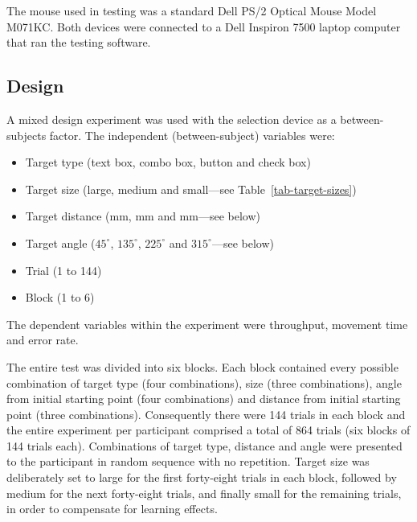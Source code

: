 \documentclass{elsart}
\begin{document}
The mouse used in testing was a standard Dell PS/2 Optical Mouse Model
M071KC. Both devices were connected to a Dell Inspiron 7500 laptop
computer that ran the testing software.


\subsection{Design}
\label{sec-method-design}

A mixed design experiment was used with the selection device as a
between-subjects factor. The independent (between-subject) variables
were:
\begin{itemize}

	\item Target type (text box, combo box, button and check box)

	\item Target size (large, medium and small---see
	Table~\ref{tab-target-sizes})

	\item Target distance (\unit[40]{mm}, \unit[80]{mm} and
	\unit[160]{mm}---see below)

	\item Target angle (\(45^{\circ}\), \(135^{\circ}\), \(225^{\circ}\)
	and \(315^{\circ}\)---see below)

	\item Trial (1 to 144)

	\item Block (1 to 6)

\end{itemize}
The dependent variables within the experiment were throughput, movement
time and error rate.

The entire test was divided into six blocks. Each block contained every
possible combination of target type (four combinations), size (three
combinations), angle from initial starting point (four combinations) and
distance from initial starting point (three combinations). Consequently
there were 144 trials in each block and the entire experiment per
participant comprised a total of 864 trials (six blocks of 144 trials
each). Combinations of target type, distance and angle were presented to
the participant in random sequence with no repetition. Target size was
deliberately set to large for the first forty-eight trials in each block,
followed by medium for the next forty-eight trials, and finally small for
the remaining trials, in order to compensate for learning effects.
\end{document}
